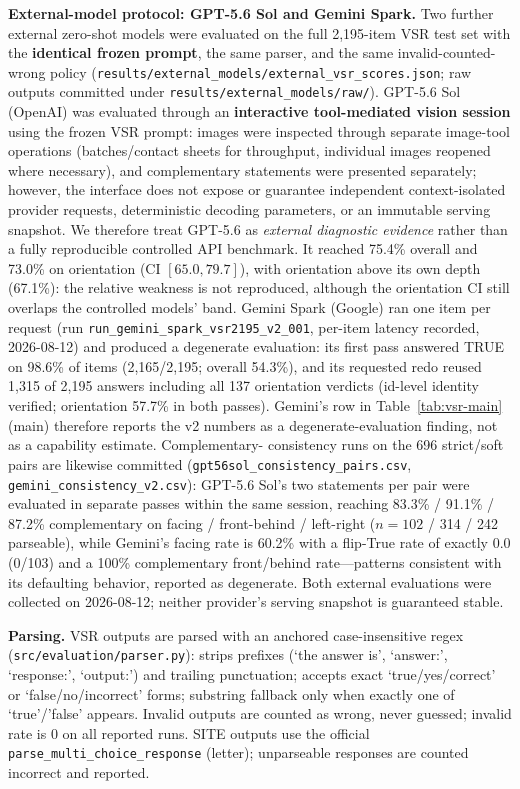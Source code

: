 \textbf{External-model protocol: GPT-5.6 Sol and Gemini Spark.}
\label{app:external}
Two further external zero-shot models were evaluated on the full 2{,}195-item
VSR test set with the \textbf{identical frozen prompt}, the same parser, and
the same invalid-counted-wrong policy
(\texttt{results/external\_models/external\_vsr\_scores.json}; raw outputs
committed under \texttt{results/external\_models/raw/}).
GPT-5.6 Sol (OpenAI) was evaluated through an \textbf{interactive
tool-mediated vision session} using the frozen VSR prompt: images were
inspected through separate image-tool operations (batches/contact sheets for
throughput, individual images reopened where necessary), and complementary
statements were presented separately; however, the interface does not expose
or guarantee independent context-isolated provider requests, deterministic
decoding parameters, or an immutable serving snapshot. We therefore treat
GPT-5.6 as \emph{external diagnostic evidence} rather than a fully
reproducible controlled API benchmark. It reached 75.4\% overall and 73.0\%
on orientation (CI $[65.0, 79.7]$), with orientation above its own depth
(67.1\%): the relative weakness is not reproduced, although the orientation
CI still overlaps the controlled models' band.
Gemini Spark (Google) ran one item per request (run
\texttt{run\_gemini\_spark\_vsr2195\_v2\_001}, per-item latency recorded,
2026-08-12) and produced a degenerate evaluation: its first pass answered
TRUE on 98.6\% of items (2{,}165/2{,}195; overall 54.3\%), and its requested
redo reused 1{,}315 of 2{,}195 answers including all 137 orientation verdicts
(id-level identity verified; orientation 57.7\% in both passes). Gemini's row
in Table~\ref{tab:vsr-main} (main) therefore reports the v2 numbers as a
degenerate-evaluation finding, not as a capability estimate. Complementary-
consistency runs on the 696 strict/soft pairs are likewise committed
(\texttt{gpt56sol\_consistency\_pairs.csv},
\texttt{gemini\_consistency\_v2.csv}): GPT-5.6 Sol's two statements per pair
were evaluated in separate passes within the same session, reaching 83.3\% /
91.1\% / 87.2\% complementary on facing / front-behind / left-right
($n{=}102$ / 314 / 242 parseable), while Gemini's facing rate is 60.2\% with
a flip-True rate of exactly 0.0 (0/103) and a 100\% complementary
front/behind rate---patterns consistent with its defaulting behavior,
reported as degenerate. Both external evaluations were collected on
2026-08-12; neither provider's serving snapshot is guaranteed stable.

\textbf{Parsing.} VSR outputs are parsed with an anchored case-insensitive
regex (\texttt{src/evaluation/parser.py}): strips prefixes
(`the answer is', `answer:', `response:', `output:') and trailing
punctuation; accepts exact `true/yes/correct' or `false/no/incorrect' forms;
substring fallback only when exactly one of `true'/'false' appears. Invalid
outputs are counted as wrong, never guessed; invalid rate is 0 on all reported
runs. SITE outputs use the official \texttt{parse\_multi\_choice\_response}
(letter); unparseable responses are counted incorrect and reported.

